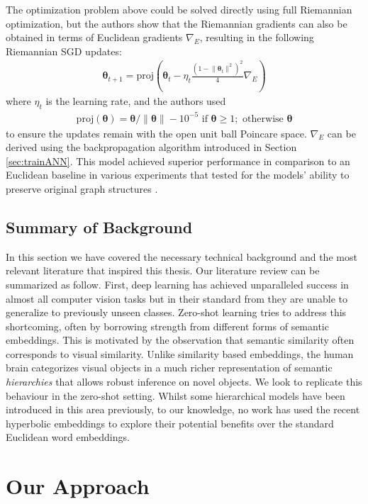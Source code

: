 \documentclass[12pt]{report}
\begin{document}
The optimization problem above could be solved directly using full Riemannian optimization, but the authors show that the Riemannian gradients can also be obtained in terms of Euclidean gradients $\nabla_E$, resulting in the following Riemannian SGD updates:  
\begin{align*}
  \boldsymbol{\theta}_{t+1} = \text{proj} \left( \boldsymbol{\theta}_t -\eta_t \frac{(1-\lVert\boldsymbol{\theta}_t\rVert^2)^2}{4}\nabla_E \right)
\end{align*}
where $\eta_t$ is the learning rate, and the authors used
\begin{align}
\text{proj}(\boldsymbol{\theta}) = \boldsymbol{\theta}/\lVert \boldsymbol{\theta} \rVert - 10^{-5}\text{ if }\boldsymbol{\theta} \geq 1; \text{ otherwise } \boldsymbol{\theta}
\end{align}
to ensure the updates remain with the open unit ball Poincare space. $\nabla_E$ can be derived using the backpropagation algorithm introduced in Section \ref{sec:trainANN}. This model achieved superior performance in comparison to an Euclidean baseline in various experiments that tested for the models' ability to preserve original graph structures \cite{Nickel2017}.

\section{Summary of Background}
In this section we have covered the necessary technical background and the most relevant literature that inspired this thesis. Our literature review can be summarized as follow. First, deep learning has achieved unparalleled success in almost all computer vision tasks but in their standard from they are unable to generalize to previously unseen classes. Zero-shot learning tries to address this shortcoming, often by borrowing strength from different forms of semantic embeddings. This is motivated by the observation that semantic similarity often corresponds to visual similarity. Unlike similarity based embeddings, the human brain categorizes visual objects in a much richer representation of semantic \textit{hierarchies} that allows robust inference on novel objects. We look to replicate this behaviour in the zero-shot setting. Whilst some hierarchical models have been introduced in this area previously, to our knowledge, no work has used the recent hyperbolic embeddings to explore their potential benefits over the standard Euclidean word embeddings.

\chapter{Our Approach}
\end{document}
